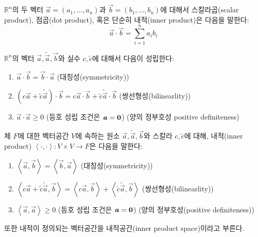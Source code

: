 \documentclass[sections/engineering_mathematics_lecture_note.tex]{subfiles}
\begin{document}
\begin{definition}
    $\mathbb R^n$의 두 벡터 $\vec a = (a_1, \dots, a_n)$과 $\vec b = (b_1, \dots, b_n)$에 대해서 스칼라곱(scalar product), 점곱(dot product), 혹은 단순히 내적(inner product)은 다음을 말한다:
    \begin{equation*}
        \vec a \cdot \vec b = \sum_{i = 1}^n a_i b_i
    \end{equation*}
\end{definition}

\begin{theorem}
    $\mathbb R^n$의 벡터 $\vec a, \tilde{\vec a}, \vec b$와 실수 $c, \tilde c$에 대해서 다음이 성립한다:
    \begin{enumerate}
        \item $\vec a \cdot \vec b = \vec b \cdot \vec a$ (대칭성(symmetricity))
        \item $(c \vec a + \tilde c \tilde{\vec a}) \cdot \vec b = c \vec a \cdot \vec b + \tilde c \tilde{\vec a} \cdot \vec b$ (쌍선형성(bilinearlity))
        \item $\vec a \cdot \vec a \geq 0$ (등호 성립 조건은 $\bm{\mathit{a}} = \bm{\mathrm{0}}$) (양의 정부호성 positive definiteness)
    \end{enumerate}
\end{theorem}

\begin{definition}
    체 $F$에 대한 벡터공간 $V$에 속하는 원소 $\vec a, \tilde{\vec a}, \vec b$와 스칼라 $c, \tilde c$에 대해, 내적(inner product) $\left<\cdot, \cdot\right>: V \times V \rightarrow F$은 다음을 말한다:
    \begin{enumerate}
        \item $\left<\vec a, \vec b\right> = \left<\vec b, \vec a\right>$ (대칭성(symmetricity))
        \item $\left<c \vec a + \tilde c \tilde{\vec a}, \vec b\right> = \left<c \vec a, \vec b\right> + \left<\tilde c \tilde{\vec a}, \vec b\right>$ (쌍선형성(bilinearlity))
        \item $\left<\vec a, \vec a\right> \geq 0$ (등호 성립 조건은 $\bm{\mathit{a}} = \bm{\mathrm{0}}$) (양의 정부호성(positive definiteness))
    \end{enumerate}
    또한 내적이 정의되는 벡터공간을 내적공간(inner product space)이라고 부른다.
\end{definition}
\end{document}
